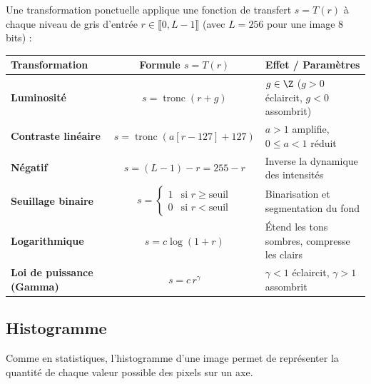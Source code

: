 \begin{proposition}
    Une transformation ponctuelle applique une fonction de transfert $s = T(r)$ à chaque niveau de gris d'entrée $r \in \llbracket 0, L-1 \rrbracket$ (avec $L = 256$ pour une image 8 bits) :
    \begin{center}
        \renewcommand{\arraystretch}{1.8}
        \begin{tabularx}{\linewidth}{l c X}
            \toprule
            \textbf{Transformation} & \textbf{Formule } $s = T(r)$ & \textbf{Effet / Paramètres} \\
            \midrule
            \textbf{Luminosité} & $s = \operatorname{tronc}(r + g)$ & $g \in \Z$ ($g > 0$ éclaircit, $g < 0$ assombrit) \\
            \textbf{Contraste linéaire} & $s = \operatorname{tronc}(a [r - 127] + 127)$ & $a > 1$ amplifie, $0 \leqslant a < 1$ réduit \\
            \textbf{Négatif} & $s = (L - 1) - r = 255 - r$ & Inverse la dynamique des intensités \\
            \textbf{Seuillage binaire} & $s = \begin{cases} 1 & \text{si } r \geqslant \text{seuil} \\ 0 & \text{si } r < \text{seuil} \end{cases}$ & Binarisation et segmentation du fond \\
            \textbf{Logarithmique} & $s = c \log(1 + r)$ & Étend les tons sombres, compresse les clairs \\
            \textbf{Loi de puissance (Gamma)} & $s = c \, r^\gamma$ & $\gamma < 1$ éclaircit, $\gamma > 1$ assombrit \\
            \bottomrule
        \end{tabularx}
    \end{center}
\end{proposition}


\subsection{Histogramme}

Comme en statistiques, l'histogramme d'une image permet de représenter la quantité de chaque valeur possible des pixels sur un axe. 

